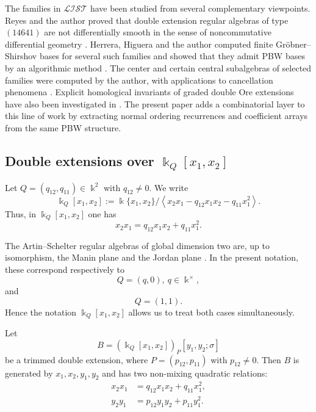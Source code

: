 \documentclass{amsart}
\theoremstyle{definition}
\theoremstyle{remark}
\numberwithin{equation}{section}
\begin{document}
The families in $\mathcal{LIST}$ have been studied from several complementary viewpoints. Reyes and the author proved that double extension regular algebras of type $(14641)$ are not differentially smooth in the sense of noncommutative differential geometry \cite{RubianoReyes2024Smooth}. Herrera, Higuera and the author computed finite Gr\"obner--Shirshov bases for several such families and showed that they admit PBW bases by an algorithmic method \cite{HerreraHigueraRubiano2025GS}. The center and certain central subalgebras of selected families were computed by the author, with applications to cancellation phenomena \cite{Rubiano2026Center}. Explicit homological invariants of graded double Ore extensions have also been investigated in \cite{Rubiano2026HomologicalInvariants}. The present paper adds a combinatorial layer to this line of work by extracting normal ordering recurrences and coefficient arrays from the same PBW structure.

\subsection{Double extensions over \texorpdfstring{$\Bbbk_Q[x_1,x_2]$}{kQ[x1,x2]}}\label{SubsectionDoubleExtensionsKQ}

Let $Q=(q_{12},q_{11})\in\Bbbk^2$ with $q_{12}\neq 0$. We write
\begin{equation}\label{DefinitionKQ}
\Bbbk_Q[x_1,x_2]
:=
\Bbbk\{x_1,x_2\}\big/
\left\langle
x_2x_1-q_{12}x_1x_2-q_{11}x_1^2
\right\rangle.
\end{equation}
Thus, in $\Bbbk_Q[x_1,x_2]$ one has
\begin{equation}\label{RelationX2X1}
x_2x_1=q_{12}x_1x_2+q_{11}x_1^2.
\end{equation}

The Artin--Schelter regular algebras of global dimension two are, up to isomorphism, the Manin plane and the Jordan plane \cite[Theorem 1.4]{Shirikov2005}. In the present notation, these correspond respectively to
\[
Q=(q,0),\ q\in\Bbbk^\times,
\]
and
\[
Q=(1,1).
\]
Hence the notation $\Bbbk_Q[x_1,x_2]$ allows us to treat both cases simultaneously.

Let
\[
B=(\Bbbk_Q[x_1,x_2])_P[y_1,y_2;\sigma]
\]
be a trimmed double extension, where $P=(p_{12},p_{11})$ with $p_{12}\neq 0$. Then $B$ is generated by $x_1,x_2,y_1,y_2$ and has two non-mixing quadratic relations:
\begin{align}
x_2x_1 &= q_{12}x_1x_2+q_{11}x_1^2, \label{NonMixingXRelation}\\
y_2y_1 &= p_{12}y_1y_2+p_{11}y_1^2. \label{NonMixingYRelation}
\end{align}
\end{document}
